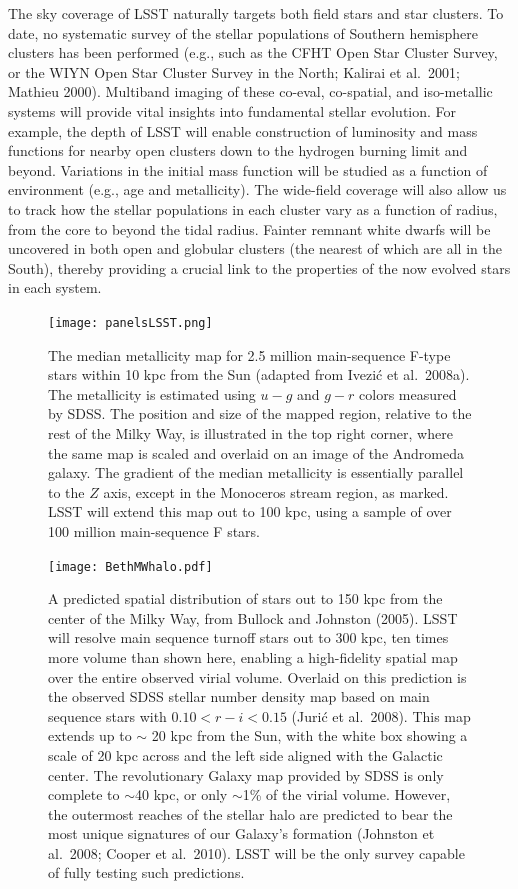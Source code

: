 The sky coverage of LSST naturally targets both field stars and star clusters.  To date, no systematic survey of the stellar 
populations of Southern hemisphere clusters has been performed (e.g., such as the CFHT Open Star Cluster Survey, or 
the WIYN Open Star Cluster Survey in the North; Kalirai et al.~2001; Mathieu 2000).  Multiband imaging of these co-eval, 
co-spatial, and iso-metallic systems will provide vital insights into fundamental stellar evolution.  For example, the depth 
of LSST will enable construction of  luminosity and mass functions for nearby open clusters down to the hydrogen burning
limit and beyond.  Variations in the initial mass function will be studied as a function of environment (e.g., age and metallicity).  
The wide-field coverage will also allow us to track how the stellar populations in each cluster vary as a function of radius, 
from the core to beyond the tidal radius. Fainter remnant white dwarfs will be uncovered in both open and globular clusters
(the nearest of which are all in the South), thereby providing a crucial link to the properties of the now evolved stars in each 
system.



\begin{figure}
\texttt{[image: panelsLSST.png]}
\caption{
The median metallicity map for 2.5 million main-sequence F-type stars within 10 kpc 
from the Sun (adapted from Ivezi\'{c} et al.~2008a). The metallicity is estimated using 
$u-g$ and $g-r$ colors measured by SDSS. The position and size of the mapped 
region, relative to the rest of the Milky Way, is illustrated in the top right 
corner, where the same map is scaled and overlaid on an image of the Andromeda 
galaxy. The gradient of the median metallicity is essentially parallel
to the $Z$ axis, except in the Monoceros stream region, as marked. LSST 
will extend this map out to 100 kpc, using a sample of over 100 million 
main-sequence F stars.} 
\label{Fig:FeH3}
\end{figure}


\begin{figure}
\hskip -0.5in
\texttt{[image: BethMWhalo.pdf]}
\caption{A predicted spatial distribution of stars out to 150 kpc from the center of the Milky Way, 
from Bullock and Johnston (2005).  LSST will resolve main sequence turnoff stars out to 300 kpc, ten times 
more volume than shown here, enabling a high-fidelity spatial map over the entire observed virial volume.  
Overlaid on this prediction is the observed SDSS stellar number density map based on main sequence stars 
with $0.10 < r-i < 0.15$ (Juri\'{c} et al.~2008).  This map extends up to $\sim$ 20 kpc from the Sun, with 
the white box showing a scale of 20 kpc across and the left side aligned with the Galactic center.  
The revolutionary Galaxy map provided by SDSS is only complete to $\sim$40 kpc, or only $\sim$1\% of
the virial volume.  However, the outermost reaches of the stellar halo are predicted to bear the most unique 
signatures of our Galaxy's formation (Johnston et al.~2008;  Cooper et al.~2010).   LSST will be the only survey 
capable of fully testing such predictions.}
\label{Fig:halo}
\end{figure}

